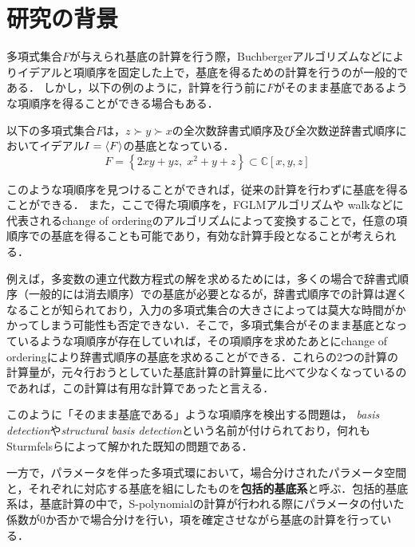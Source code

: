 \section{研究の背景}
多項式集合$F$が与えられ\groebner{}基底の計算を行う際，Buchbergerアルゴリズム\cite{buchberger2006bruno}などによりイデアルと項順序を固定した上で，\groebner{}基底を得るための計算を行うのが一般的である．
しかし，以下の例のように，計算を行う前に$F$がそのまま\groebner{}基底であるような項順序を得ることができる場合もある．
\begin{example}
	以下の多項式集合$F$は，$z \succ y \succ x$の全次数辞書式順序及び全次数逆辞書式順序においてイデアル$I = \langle F \rangle$の\groebner{}基底となっている．
	$$F = \left\{ 2xy + yz, \; x^2 + y + z \right\} \subset \mathbb{C}[x, y, z]$$
\end{example}
このような項順序を見つけることができれば，従来の計算を行わずに\groebner{}基底を得ることができる．
また，ここで得た項順序を，FGLMアルゴリズム\cite{faugere1993efficient}や\groebner{} walk\cite{collart1993grobner}などに代表されるchange of orderingのアルゴリズムによって変換することで，任意の項順序での\groebner{}基底を得ることも可能であり，有効な計算手段となることが考えられる．
\par
例えば，多変数の連立代数方程式の解を求めるためには，多くの場合で辞書式順序（一般的には消去順序）での\groebner{}基底が必要となるが，辞書式順序での計算は遅くなることが知られており，入力の多項式集合の大きさによっては莫大な時間がかかってしまう可能性も否定できない．そこで，多項式集合がそのまま\groebner{}基底となっているような項順序が存在していれば，その項順序を求めたあとにchange of orderingにより辞書式順序の\groebner{}基底を求めることができる．これらの$2$つの計算の計算量が，元々行おうとしていた\groebner{}基底計算の計算量に比べて少なくなっているのであれば，この計算は有用な計算であったと言える．
\par
このように「そのまま\groebner{}基底である」ような項順序を検出する問題は，\emph{\groebner{} basis detection}\cite{gritzmann1993minkowski}や\emph{structural \groebner{} basis detection}\cite{sturmfels1997structural}という名前が付けられており，何れもSturmfelsらによって解かれた既知の問題である．
\par
一方で，パラメータを伴った多項式環において，場合分けされたパラメータ空間と，それぞれに対応する\groebner{}基底を組にしたものを\textbf{包括的\groebner{}基底系}\cite{weispfenning1992comprehensive}と呼ぶ．包括的\groebner{}基底系は，\groebner{}基底計算の中で，\textrm{S-polynomial}の計算が行われる際にパラメータの付いた係数が$0$か否かで場合分けを行い，項を確定させながら\groebner{}基底の計算を行っている．
